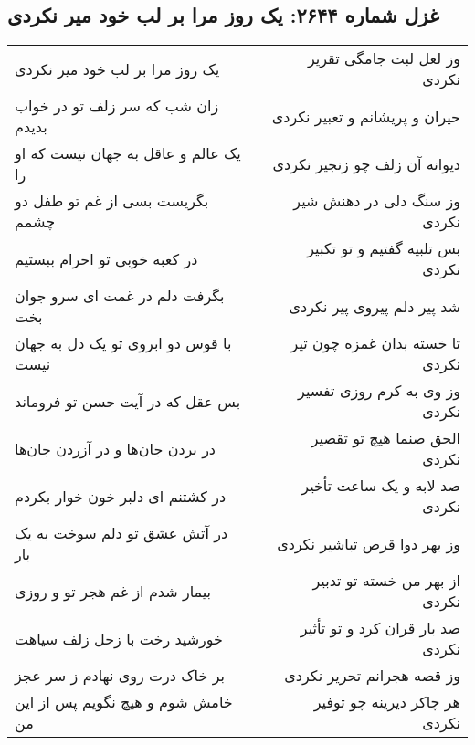 \begin{center}
\section*{غزل شماره ۲۶۴۴: یک روز مرا بر لب خود میر نکردی}
\label{sec:2644}
\begin{longtable}{l p{0.5cm} r}
یک روز مرا بر لب خود میر نکردی
&&
وز لعل لبت جامگی تقریر نکردی
\\
زان شب که سر زلف تو در خواب بدیدم
&&
حیران و پریشانم و تعبیر نکردی
\\
یک عالم و عاقل به جهان نیست که او را
&&
دیوانه آن زلف چو زنجیر نکردی
\\
بگریست بسی از غم تو طفل دو چشمم
&&
وز سنگ دلی در دهنش شیر نکردی
\\
در کعبه خوبی تو احرام ببستیم
&&
بس تلبیه گفتیم و تو تکبیر نکردی
\\
بگرفت دلم در غمت ای سرو جوان بخت
&&
شد پیر دلم پیروی پیر نکردی
\\
با قوس دو ابروی تو یک دل به جهان نیست
&&
تا خسته بدان غمزه چون تیر نکردی
\\
بس عقل که در آیت حسن تو فروماند
&&
وز وی به کرم روزی تفسیر نکردی
\\
در بردن جان‌ها و در آزردن جان‌ها
&&
الحق صنما هیچ تو تقصیر نکردی
\\
در کشتنم ای دلبر خون خوار بکردم
&&
صد لابه و یک ساعت تأخیر نکردی
\\
در آتش عشق تو دلم سوخت به یک بار
&&
وز بهر دوا قرص تباشیر نکردی
\\
بیمار شدم از غم هجر تو و روزی
&&
از بهر من خسته تو تدبیر نکردی
\\
خورشید رخت با زحل زلف سیاهت
&&
صد بار قران کرد و تو تأثیر نکردی
\\
بر خاک درت روی نهادم ز سر عجز
&&
وز قصه هجرانم تحریر نکردی
\\
خامش شوم و هیچ نگویم پس از این من
&&
هر چاکر دیرینه چو توفیر نکردی
\\
\end{longtable}
\end{center}
